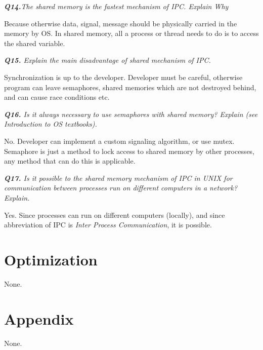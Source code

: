 \documentclass[11pt]{article}
\begin{document}
\vspace{5mm}
\textit{\textbf{Q14.}The shared memory is the fastest mechanism of IPC. Explain Why}
\vspace{5mm}

Because otherwise data, signal, message should be physically carried in the memory by OS. In shared memory, all a process or thread needs to do is to access the shared variable.

\vspace{5mm}
\textit{\textbf{Q15.} Explain the main disadvantage of shared mechanism of IPC.}
\vspace{5mm}

Synchronization is up to the developer. Developer must be careful, otherwise program can leave semaphores, shared memories which are not destroyed behind, and can cause race conditions etc.

\vspace{5mm}
\textit{\textbf{Q16.} Is it always necessary to use semaphores with shared memory? Explain (see Introduction to OS textbooks).}
\vspace{5mm}

No. Developer can implement a custom signaling algorithm, or use mutex. Semaphore is just a method to lock access to shared memory by other processes, any method that can do this is applicable. 

\vspace{5mm}
\textit{\textbf{Q17.} Is it possible to the shared memory mechanism of IPC in UNIX for communication between processes run on different computers in a network? Explain.}
\vspace{5mm}

Yes. Since processes can run on different computers (locally), and since abbreviation of IPC is \textit{Inter Process Communication}, it is possible.

\section*{Optimization}
None.
\section*{Appendix}
None.
\end{document}
